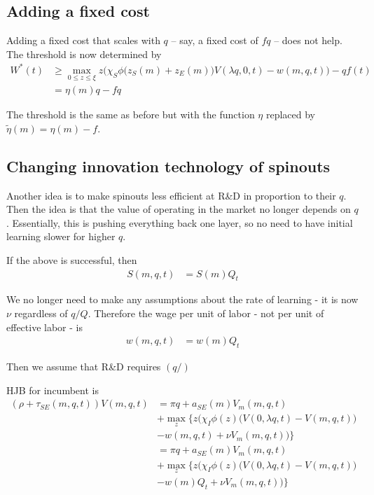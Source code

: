 \documentclass[11pt,english]{article}
\theoremstyle{remark}
\begin{document}
\subsection{Adding a fixed cost}

Adding a fixed cost that scales with $q$ -- say, a fixed cost of $fq$ -- does not help. The threshold is now determined by 
\begin{align*}
	W^*(t) &\ge \max_{0 \le z \le \xi} z \Big(\chi_S  \phi \big( z_S(m) + z_E(m)\big) V(\lambda q,0,t) - w(m,q,t) \Big) - qf(t) \\
		   &= \eta(m) q	- f q 
\end{align*} 

The threshold is the same as before but with the function $\eta$ replaced by $\tilde{\eta}(m) = \eta(m) - f$.

\subsection{Changing innovation technology of spinouts}

Another idea is to make spinouts less efficient at R\&D in proportion to their $q$. Then the idea is that the value of operating in the market no longer depends on $q$. Essentially, this is pushing everything back one layer, so no need to have initial learning slower for higher $q$.

If the above is successful, then 
\begin{align*}
	S(m,q,t) &= S(m) Q_t
\end{align*}

We no longer need to make any assumptions about the rate of learning - it is now $\nu$ regardless of $q/Q$. Therefore the wage per unit of labor - not per unit of effective labor - is
\begin{align*}
	w(m,q,t) &= w(m) Q_t
\end{align*}

Then we assume that R\&D requires $(q / )$

HJB for incumbent is
\begin{align*}
	(\rho + \tau_{SE}(m,q,t)) V(m,q,t) &= \pi q + a_{SE}(m) V_m(m,q,t) \\
	     &+ \max_z \Big\{ z \Big( \chi_I \phi(z) \big( V(0,\lambda q, t) - V(m,q,t) \big) \\
	     &- w(m,q,t) + \nu V_m (m,q,t)   \Big)     \Big\} \\
	     &= \pi q + a_{SE}(m) V_m(m,q,t) \\
	     &+ \max_z \Big\{ z \Big( \chi_I \phi(z) \big( V(0,\lambda q, t) - V(m,q,t) \big) \\
	     &- w(m)Q_t + \nu V_m (m,q,t) \Big) \Big\}
\end{align*}
\end{document}
